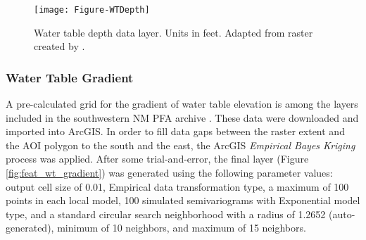 \begin{figure}[!htp]
\centering
\texttt{[image: Figure-WTDepth]}
\caption[Water table depth data layer]{Water table depth data layer. Units in feet. Adapted from raster created by \protect\citep{bielicki_hydrogeolgic_2015}.}
\label{fig:feat_wtdepth}
\end{figure}

\subsubsection{Water Table Gradient}

A pre-calculated grid for the gradient of water table elevation is among the layers included in the southwestern NM PFA archive \citep{kelley_geothermal_2015}. These data were downloaded and imported into ArcGIS. In order to fill data gaps between the raster extent and the AOI polygon to the south and the east, the ArcGIS \textit{Empirical Bayes Kriging} process was applied. After some trial-and-error, the final layer (Figure \ref{fig:feat_wt_gradient}) was generated using the following parameter values: output cell size of 0.01, Empirical data transformation type, a maximum of 100 points in each local model, 100 simulated semivariograms with Exponential model type, and a standard circular search neighborhood with a radius of 1.2652 (auto-generated), minimum of 10 neighbors, and maximum of 15 neighbors.

